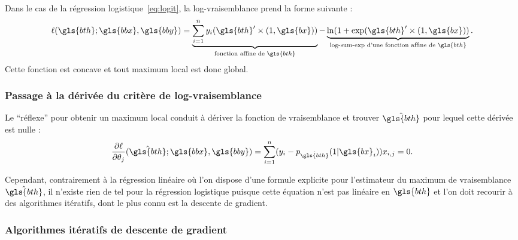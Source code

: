 Dans le cas de la régression logistique~\eqref{eq:logit}, la log-vraisemblance prend la forme suivante :
\[ \ell(\gls{bth};\gls{bbx},\gls{bby}) = \underbrace{\sum_{i=1}^n y_i (\gls{bth}' \times (1,\gls{bx}))}_{\text{fonction affine de } \gls{bth}} - \underbrace{\ln(1 + \exp(\gls{bth}' \times (1,\gls{bx}))}_{\text{log-sum-exp d'une fonction affine de } \gls{bth}}.\]
Cette fonction est concave et tout maximum local est donc global. 

\subsubsection{Passage à la dérivée du critère de log-vraisemblance}

Le ``réflexe'' pour obtenir un maximum local conduit à dériver la fonction de vraisemblance et trouver $\hat{\gls{bth}}$ pour lequel cette dérivée est nulle :
\[ \dfrac{\partial \ell}{\partial \theta_j} (\hat{\gls{bth}};\gls{bbx},\gls{bby})= \sum_{i=1}^n (y_i - p_{\hat{\gls{bth}}}(1|\gls{bx}_i)) x_{i,j} = 0.\]

Cependant, contrairement à la régression linéaire où l'on dispose d'une formule explicite pour l'estimateur du maximum de vraisemblance $\hat{\gls{bth}}$, il n'existe rien de tel pour la régression logistique puisque cette équation n'est pas linéaire en $\gls{bth}$ et l'on doit recourir à des algorithmes itératifs, dont le plus connu est la descente de gradient.

\subsubsection{Algorithmes itératifs de descente de gradient}


